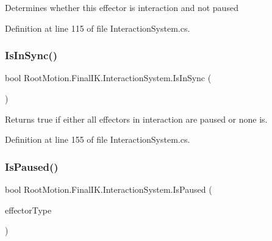 Determines whether this effector is interaction and not paused 



Definition at line 115 of file Interaction\+System.\+cs.

\mbox{\label{class_root_motion_1_1_final_i_k_1_1_interaction_system_aaa06cd44fe10d5ead7a8a5db3e4cabdd}} 
\subsubsection{\texorpdfstring{Is\+In\+Sync()}{IsInSync()}}
{\footnotesize\ttfamily bool Root\+Motion.\+Final\+I\+K.\+Interaction\+System.\+Is\+In\+Sync (\begin{DoxyParamCaption}{ }\end{DoxyParamCaption})}



Returns true if either all effectors in interaction are paused or none is. 



Definition at line 155 of file Interaction\+System.\+cs.

\mbox{\label{class_root_motion_1_1_final_i_k_1_1_interaction_system_a458320440713a540dda0babc58c754a9}} 
\subsubsection{\texorpdfstring{Is\+Paused()}{IsPaused()}\hspace{0.1cm}{\footnotesize\ttfamily [1/2]}}
{\footnotesize\ttfamily bool Root\+Motion.\+Final\+I\+K.\+Interaction\+System.\+Is\+Paused (\begin{DoxyParamCaption}\item[{\mbox{\hyperlink{namespace_root_motion_1_1_final_i_k_ae0dd2058c7667b6f132c11a6b860c14a}{Full\+Body\+Biped\+Effector}}}]{effector\+Type }\end{DoxyParamCaption})}



